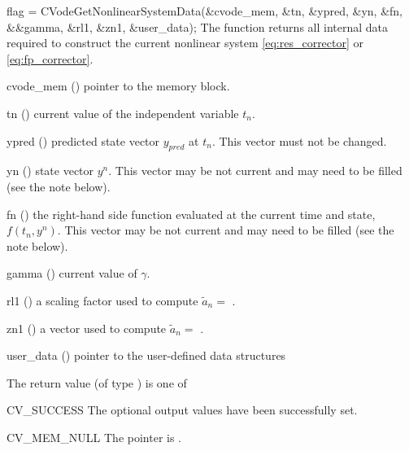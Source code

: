 {
  flag = CVodeGetNonlinearSystemData(&cvode\_mem, \&tn, \&ypred, \&yn, \&fn,\\
                                     &\&gamma, \&rl1, \&zn1, \&user\_data);
}
{
  The function  returns all internal
  data required to construct the current nonlinear system
  \eqref{eq:res_corrector} or \eqref{eq:fp_corrector}.
}
{
  \begin{args}
  \item[cvode\_mem] () pointer to the {\cvode} memory block.
  \item[tn] () current value of the independent variable $t_n$.
  \item[ypred] () predicted state vector $y_{pred}$ at $t_n$.
    This vector must not be changed.
  \item[yn] () state vector $y^n$. This vector may be
    not current and may need to be filled (see the note below).
  \item[fn] () the right-hand side function evaluated at the
    current time and state, $f(t_n, y^n)$. This vector may be
    not current and may need to be filled (see the note below).
  \item[gamma] () current value of $\gamma$.
  \item[rl1] () a scaling factor used to compute $\tilde{a}_n = $
    .
  \item[zn1] () a vector used to compute $\tilde{a}_n = $
    .
  \item[user\_data] () pointer to the user-defined data structures
  \end{args}
}
{
  The return value  (of type ) is one of
  \begin{args}
  \item[CV\_SUCCESS]
    The optional output values have been successfully set.
  \item[CV\_MEM\_NULL]
    The  pointer is .
  \end{args}
}
